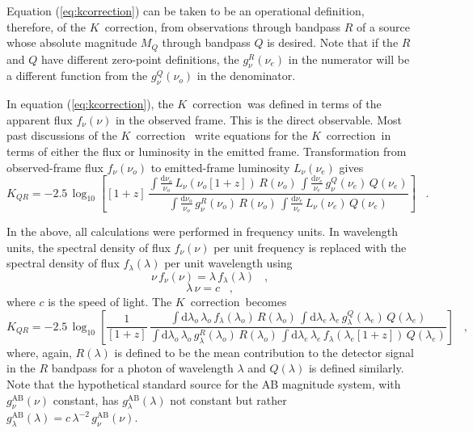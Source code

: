 \documentclass[preprint]{aastex}
\newcommand{\kcorrection}{$K$~correction}
\newcommand{\nuobs}{\nu_o}
\newcommand{\nuemit}{\nu_e}
\newcommand{\lambdaobs}{\lambda_o}
\newcommand{\lambdaemit}{\lambda_e}
\begin{document}
Equation (\ref{eq:kcorrection}) can be taken to be an operational
definition, therefore, of the \kcorrection, from observations through
bandpass $R$ of a source whose absolute magnitude $M_Q$ through
bandpass $Q$ is desired.  Note that if the $R$ and $Q$ have different
zero-point definitions, the $g^R_{\nu}(\nuemit)$ in the numerator will
be a different function from the $g^Q_{\nu}(\nuobs)$ in the
denominator.

In equation (\ref{eq:kcorrection}), the \kcorrection\ was defined in
terms of the apparent flux $f_{\nu}(\nu)$ in the observed frame.  This
is the direct observable.  Most past discussions of the \kcorrection\
\citep[eg,][]{oke68a, kim96a} write equations for the \kcorrection\ in
terms of either the flux or luminosity in the emitted frame.
Transformation from observed-frame flux $f_{\nu}(\nuobs)$ to
emitted-frame luminosity $L_{\nu}(\nuemit)$ gives
\begin{equation}
\label{eq:kcorrectionL}
K_{QR} = -2.5\,\log_{10}\left[[1+z]\,
  \frac{\displaystyle
          \int\frac{\mathrm{d}\nuobs}{\nuobs}\,L_{\nu}(\nuobs[1+z])\,R(\nuobs)\,
          \int\frac{\mathrm{d}\nuemit}{\nuemit}\,g^Q_{\nu}(\nuemit)\,Q(\nuemit)}
       {\displaystyle
          \int\frac{\mathrm{d}\nuobs}{\nuobs}\,g^R_{\nu}(\nuobs)\,R(\nuobs)\,
          \int\frac{\mathrm{d}\nuemit}{\nuemit}\,
            L_{\nu}(\nuemit)\,Q(\nuemit)}
\right] \;\;\;.
\end{equation}

In the above, all calculations were performed in frequency units.  In
wavelength units, the spectral density of flux $f_{\nu}(\nu)$ per unit
frequency is replaced with the spectral density of flux
$f_{\lambda}(\lambda)$ per unit wavelength using
\begin{equation}
\nu\,f_{\nu}(\nu) = \lambda\,f_{\lambda}(\lambda) \;\;\;,
\end{equation}
\begin{equation}
\lambda\,\nu = c \;\;\;,
\end{equation}
where $c$ is the speed of light.  The \kcorrection\ becomes
\begin{equation}
\label{eq:wavelength}
K_{QR} = -2.5\,\log_{10}\left[\frac{1}{[1+z]}\,
  \frac{\displaystyle
  \int\mathrm{d}\lambdaobs\,\lambdaobs\,f_{\lambda}(\lambdaobs)\,R(\lambdaobs)\,
    \int\mathrm{d}\lambdaemit\,\lambdaemit\,
    g^Q_{\lambda}(\lambdaemit)\,Q(\lambdaemit)}
       {\displaystyle
  \int\mathrm{d}\lambdaobs\,\lambdaobs\,g^R_{\lambda}(\lambdaobs)\,R(\lambdaobs)\,
    \int\mathrm{d}\lambdaemit\,\lambdaemit\,
    f_{\lambda}(\lambdaemit[1+z])\,Q(\lambdaemit)}
\right] \;\;\;,
\end{equation}
where, again, $R(\lambda)$ is defined to be the mean contribution to
the detector signal in the $R$ bandpass for a photon of wavelength
$\lambda$ and $Q(\lambda)$ is defined similarly.  Note that the
hypothetical standard source for the AB magnitude system, with
$g^\mathrm{AB}_{\nu}(\nu)$ constant, has
$g^\mathrm{AB}_{\lambda}(\lambda)$ not constant but rather
$g^\mathrm{AB}_{\lambda}(\lambda)=
c\,\lambda^{-2}\,g^\mathrm{AB}_{\nu}(\nu)$.
\end{document}
